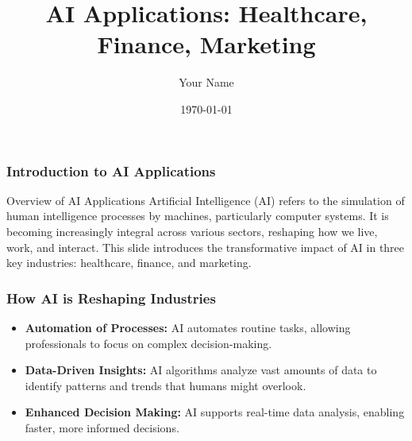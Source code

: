 \documentclass{beamer}
\title{AI Applications: Healthcare, Finance, Marketing}
\author{Your Name}
\institute{Your Institution}
\date{\today}
\begin{document}
\frame{\titlepage}

\begin{frame}[fragile]
    \frametitle{Introduction to AI Applications}
    \begin{block}{Overview of AI Applications}
        Artificial Intelligence (AI) refers to the simulation of human intelligence processes by machines, particularly computer systems. It is becoming increasingly integral across various sectors, reshaping how we live, work, and interact. This slide introduces the transformative impact of AI in three key industries: healthcare, finance, and marketing.
    \end{block}
\end{frame}

\begin{frame}[fragile]
    \frametitle{How AI is Reshaping Industries}
    \begin{itemize}
        \item \textbf{Automation of Processes:} AI automates routine tasks, allowing professionals to focus on complex decision-making.
        \item \textbf{Data-Driven Insights:} AI algorithms analyze vast amounts of data to identify patterns and trends that humans might overlook.
        \item \textbf{Enhanced Decision Making:} AI supports real-time data analysis, enabling faster, more informed decisions.
    \end{itemize}
\end{frame}
\end{document}
